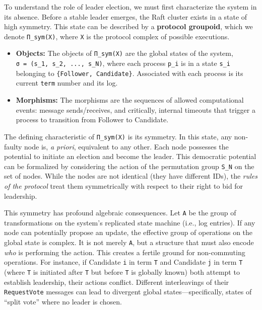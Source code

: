 \documentclass[
]{article}
\providecommand{\tightlist}{%
  \setlength{\itemsep}{0pt}\setlength{\parskip}{0pt}}
\begin{document}
To understand the role of leader election, we must first characterize
the system in its absence. Before a stable leader emerges, the Raft
cluster exists in a state of high symmetry. This state can be described
by a \textbf{protocol groupoid}, which we denote \texttt{Π\_sym(X)},
where \texttt{X} is the protocol complex of possible executions.

\begin{itemize}
\tightlist
\item
  \textbf{Objects:} The objects of \texttt{Π\_sym(X)} are the global
  states of the system, \texttt{σ\ =\ (s\_1,\ s\_2,\ ...,\ s\_N)}, where
  each process \texttt{p\_i} is in a state \texttt{s\_i} belonging to
  \texttt{\{Follower,\ Candidate\}}. Associated with each process is its
  current \texttt{term} number and its log.
\item
  \textbf{Morphisms:} The morphisms are the sequences of allowed
  computational events: message sends/receives, and critically, internal
  timeouts that trigger a process to transition from Follower to
  Candidate.
\end{itemize}

The defining characteristic of \texttt{Π\_sym(X)} is its symmetry. In
this state, any non-faulty node is, \emph{a priori}, equivalent to any
other. Each node possesses the potential to initiate an election and
become the leader. This democratic potential can be formalized by
considering the action of the permutation group \texttt{S\_N} on the set
of nodes. While the nodes are not identical (they have different IDs),
the \emph{rules of the protocol} treat them symmetrically with respect
to their right to bid for leadership.

This symmetry has profound algebraic consequences. Let \texttt{A} be the
group of transformations on the system's replicated state machine (i.e.,
log entries). If any node can potentially propose an update, the
effective group of operations on the global state is complex. It is not
merely \texttt{A}, but a structure that must also encode \emph{who} is
performing the action. This creates a fertile ground for non-commuting
operations. For instance, if Candidate \texttt{i} in term \texttt{T} and
Candidate \texttt{j} in term \texttt{T\textquotesingle{}} (where
\texttt{T\textquotesingle{}} is initiated after \texttt{T} but before
\texttt{T} is globally known) both attempt to establish leadership,
their actions conflict. Different interleavings of their
\texttt{RequestVote} messages can lead to divergent global
states---specifically, states of ``split vote'' where no leader is
chosen.
\end{document}
